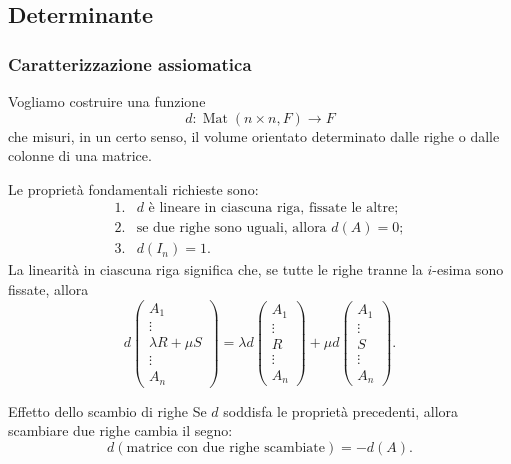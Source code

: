 \documentclass[a4paper]{article}
\begin{document}
\subsection{Determinante}

\subsubsection{Caratterizzazione assiomatica}

Vogliamo costruire una funzione
\[
    d:\operatorname{Mat}(n\times n,F)\to F
\]
che misuri, in un certo senso, il volume orientato determinato dalle righe o dalle colonne di una matrice.

Le proprietà fondamentali richieste sono:
\[
    \begin{array}{ll}
        \text{1.} & d \text{ è lineare in ciascuna riga, fissate le altre;}\\[1mm]
        \text{2.} & \text{se due righe sono uguali, allora } d(A)=0;\\[1mm]
        \text{3.} & d(I_n)=1.
    \end{array}
\]
La linearità in ciascuna riga significa che, se tutte le righe tranne la \(i\)-esima sono fissate, allora
\[
    d
    \begin{pmatrix}
        A_1\\
        \vdots\\
        \lambda R+\mu S\\
        \vdots\\
        A_n
    \end{pmatrix}
    =
    \lambda
    d
    \begin{pmatrix}
        A_1\\
        \vdots\\
        R\\
        \vdots\\
        A_n
    \end{pmatrix}
    +
    \mu
    d
    \begin{pmatrix}
        A_1\\
        \vdots\\
        S\\
        \vdots\\
        A_n
    \end{pmatrix}.
\]

\begin{snippetproposition}{Effetto dello scambio di righe}
    Se \(d\) soddisfa le proprietà precedenti, allora scambiare due righe cambia il segno:
    \[
        d(\text{matrice con due righe scambiate})=-d(A).
    \]
\end{snippetproposition}
\end{document}
